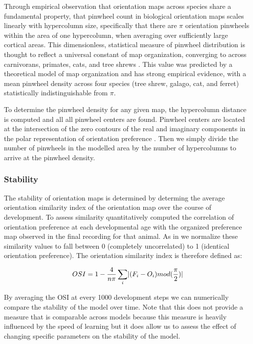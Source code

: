 Through empirical observation that orientation maps across species
share a fundamental property, that pinwheel count in biological
orientation maps scales linearly with hypercolumn size, specifically
that there are $\pi$ orientation pinwheels within the area of one
hypercolumn, when averaging over sufficiently large cortical
areas. This dimensionless, statistical measure of pinwheel
distribution is thought to reflect a universal constant of map
organization, converging to across carnivorans, primates, cats, and
tree shrews \citep{Kaschube2010, Keil2012}. This value was predicted
by a theoretical model of map organization and has strong empirical
evidence, with a mean pinwheel density across four species (tree
shrew, galago, cat, and ferret) statistically indistinguishable from
$\pi$.

To determine the pinwheel density for any given map, the hypercolumn
distance is computed and all all pinwheel centers are found. Pinwheel
centers are located at the intersection of the zero contours of the
real and imaginary components in the polar representation of
orientation preference \citep{Lowel1998}. Then we simply divide the
number of pinwheels in the modelled area by the number of hypercolumns
to arrive at the pinwheel density.

\subsubsection{Stability}

The stability of orientation maps is determined by determing the
average orientation similarity index of the orientation map over the
course of development. To assess similarity quantitatively
\cite{Chapman1996} computed the correlation of orientation preference
at each developmental age with the organized preference map observed
in the final recording for that animal. As in \cite{Stevens2013} we
normalize these similarity values to fall between 0 (completely
uncorrelated) to 1 (identical orientation preference). The orientation
similarity index is therefore defined as:

\begin{equation}
  OSI = 1 - \frac{4}{n\pi} \sum_{i}\lvert(F_{i}-O_{i})mod(\frac{\pi}{2})\rvert
\end{equation}

By averaging the OSI at every 1000 development steps we can
numerically compare the stability of the model over time. Note that
this does not provide a measure that is comparable across models
because this measure is heavily influenced by the speed of learning
but it does allow us to assess the effect of changing specific
parameters on the stability of the model.


